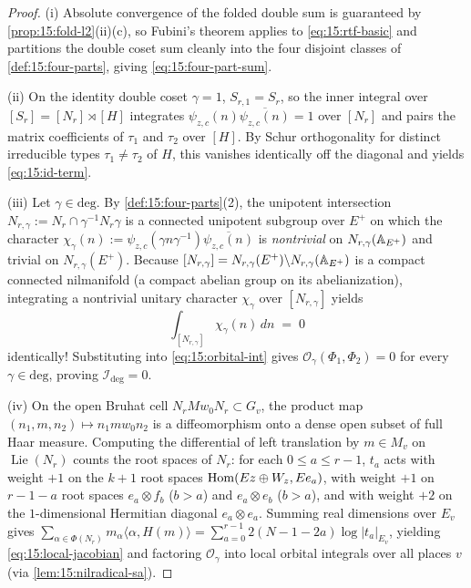 \begin{proof}
(i) Absolute convergence of the folded double sum is guaranteed by \cref{prop:15:fold-l2}(ii)(c), so Fubini's theorem applies to \eqref{eq:15:rtf-basic} and partitions the double coset sum cleanly into the four disjoint classes of \cref{def:15:four-parts}, giving \eqref{eq:15:four-part-sum}.

(ii) On the identity double coset $\gamma = 1$, $S_{r, 1} = S_r$, so the inner integral over $[S_r] = [N_r] \rtimes [H]$ integrates $\psi_{z,c}(n)\overline{\psi_{z,c}(n)} = 1$ over $[N_r]$ and pairs the matrix coefficients of $\tau_1$ and $\tau_2$ over $[H]$. By Schur orthogonality for distinct irreducible types $\tau_1 \neq \tau_2$ of $H$, this vanishes identically off the diagonal and yields \eqref{eq:15:id-term}.

(iii) Let $\gamma \in \mathrm{deg}$. By \cref{def:15:four-parts}(2), the unipotent intersection $N_{r, \gamma} := N_r \cap \gamma^{-1} N_r \gamma$ is a connected unipotent subgroup over $E^+$ on which the character $\chi_\gamma(n) := \psi_{z,c}(\gamma n \gamma^{-1})\overline{\psi_{z,c}(n)}$ is \emph{nontrivial} on $N_{r, \gamma}(\mathbb{A}_{E^+})$ and trivial on $N_{r, \gamma}(E^+)$. Because $[N_{r, \gamma}] = N_{r, \gamma}(E^+) \backslash N_{r, \gamma}(\mathbb{A}_{E^+})$ is a compact connected nilmanifold (a compact abelian group on its abelianization), integrating a nontrivial unitary character $\chi_\gamma$ over $[N_{r, \gamma}]$ yields
\[
  \int_{[N_{r, \gamma}]} \chi_\gamma(n)\, dn \;=\; 0
\]
identically! Substituting into \eqref{eq:15:orbital-int} gives $\mathcal{O}_\gamma(\Phi_1, \Phi_2) = 0$ for every $\gamma \in \mathrm{deg}$, proving $\mathcal{I}_{\mathrm{deg}} = 0$.

(iv) On the open Bruhat cell $N_r M w_0 N_r \subset G_v$, the product map $(n_1, m, n_2) \mapsto n_1 m w_0 n_2$ is a diffeomorphism onto a dense open subset of full Haar measure. Computing the differential of left translation by $m \in M_v$ on $\operatorname{Lie}(N_r)$ counts the root spaces of $N_r$: for each $0 \le a \le r - 1$, $t_a$ acts with weight $+1$ on the $k + 1$ root spaces $\mathrm{Hom}(E z \oplus W_z, E e_a)$, with weight $+1$ on $r - 1 - a$ root spaces $e_a \otimes f_b$ ($b > a$) and $e_a \otimes e_b$ ($b > a$), and with weight $+2$ on the $1$-dimensional Hermitian diagonal $e_a \otimes e_a$. Summing real dimensions over $E_v$ gives $\sum_{\alpha \in \Phi(N_r)} m_\alpha \langle \alpha, H(m)\rangle = \sum_{a=0}^{r-1} 2(N - 1 - 2a)\log|t_a|_{E_v}$, yielding \eqref{eq:15:local-jacobian} and factoring $\mathcal{O}_\gamma$ into local orbital integrals over all places $v$ (via \cref{lem:15:nilradical-sa}).
\end{proof}

